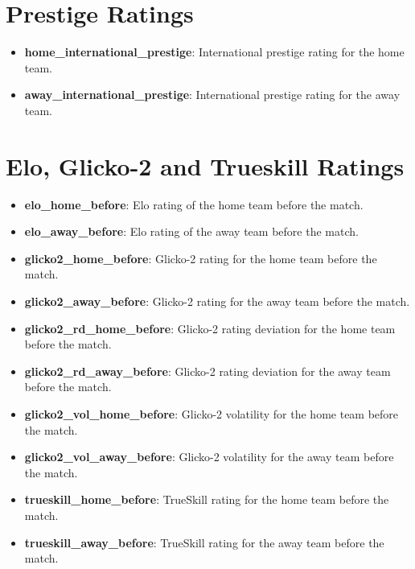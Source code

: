 \section{Prestige Ratings}
\begin{itemize}
    \item \textbf{home\_international\_prestige}: International prestige rating for the home team.
    \item \textbf{away\_international\_prestige}: International prestige rating for the away team.
\end{itemize}

\section{Elo, Glicko-2 and Trueskill Ratings}
\begin{itemize}
    \item \textbf{elo\_home\_before}: Elo rating of the home team before the match.
    \item \textbf{elo\_away\_before}: Elo rating of the away team before the match.
    \item \textbf{glicko2\_home\_before}: Glicko-2 rating for the home team before the match.
    \item \textbf{glicko2\_away\_before}: Glicko-2 rating for the away team before the match.
    \item \textbf{glicko2\_rd\_home\_before}: Glicko-2 rating deviation for the home team before the match.
    \item \textbf{glicko2\_rd\_away\_before}: Glicko-2 rating deviation for the away team before the match.
    \item \textbf{glicko2\_vol\_home\_before}: Glicko-2 volatility for the home team before the match.
    \item \textbf{glicko2\_vol\_away\_before}: Glicko-2 volatility for the away team before the match.
    \item \textbf{trueskill\_home\_before}: TrueSkill rating for the home team before the match.
    \item \textbf{trueskill\_away\_before}: TrueSkill rating for the away team before the match.
\end{itemize}

